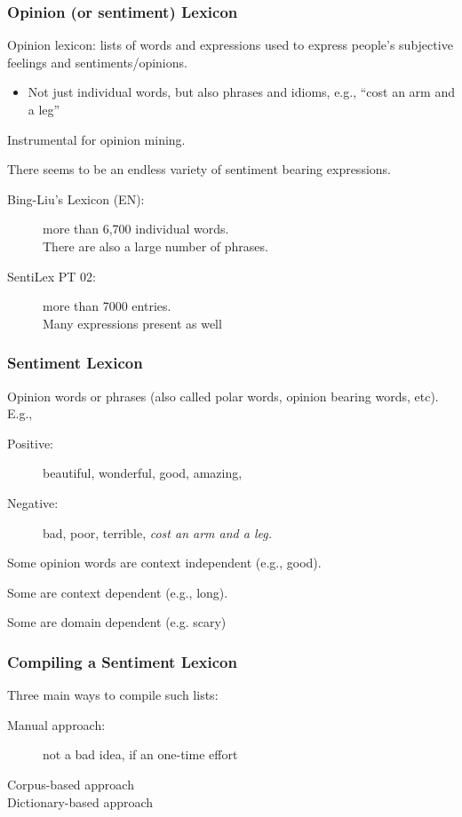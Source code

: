 \documentclass[t]{beamer}
\begin{document}
\begin{frame} \frametitle{Opinion (or sentiment) Lexicon} %


Opinion lexicon: lists of words and expressions used to express people's subjective feelings and sentiments/opinions.
\begin{itemize}
 \item Not just individual words, but also phrases and idioms, e.g., ``cost an arm and a leg''
\end{itemize}

\vfill
Instrumental for opinion mining. 

\vfill
There seems to be an endless variety of sentiment bearing expressions.
\begin{description} 
\item [Bing-Liu's Lexicon (EN):] more than 6,700 individual words. \\
There are also a large number of phrases.
\item [SentiLex PT 02:] more than 7000 entries. \\
Many expressions present as well
\end{description}


\end{frame}



\begin{frame} \frametitle{Sentiment Lexicon} %


Opinion words or phrases (also called polar words, opinion bearing words, etc). E.g.,

\begin{description}
\item [Positive:] beautiful, wonderful, good, amazing, 
\item [Negative:] bad, poor, terrible, {\em cost an arm and a leg.}
\end{description}

\vfill

Some opinion words are context independent (e.g., good).

\vfill
Some are context dependent (e.g., long).

\vfill

Some are domain dependent (e.g. scary)

\end{frame}


\begin{frame} \frametitle{Compiling a Sentiment Lexicon} %

Three main ways to compile such lists:
\begin{description}  
\item [Manual approach: ] not a bad idea, if an one-time effort 
\item [Corpus-based approach ]
\item  [Dictionary-based approach]

\end{description}

\end{frame}
\end{document}
